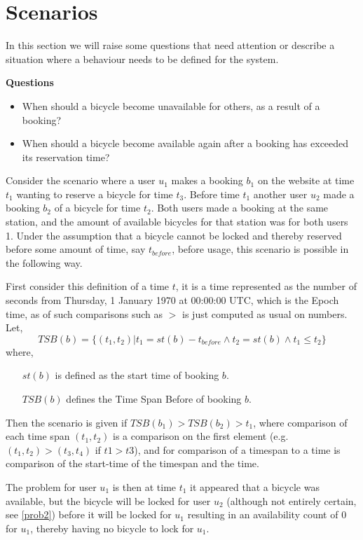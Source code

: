 \section{Scenarios}\label{sec:behaviourProblems}
In this section we will raise some questions that need attention or describe a situation where a behaviour needs to be defined for the system.

\textbf{Questions}
\begin{itemize}
\item When should a bicycle become unavailable for others, as a result of a booking?
\item When should a bicycle become available again after a booking has exceeded its reservation time?
\end{itemize}

\begin{description}[style=nextline]\label{prob1}
\item[Problem 1.1] Consider the scenario where a user $u_1$ makes a booking $b_1$ on the website at time $t_1$ wanting to reserve a bicycle for time $t_3$. Before time $t_1$ another user $u_2$ made a booking $b_2$ of a bicycle for time $t_2$. Both users made a booking at the same station, and the amount of available bicycles for that station was for both users 1. Under the assumption that a bicycle cannot be locked and thereby reserved before some amount of time, say $t_{before}$, before usage, this scenario is possible in the following way.

First consider this definition of a time $t$, it is a time represented as the number of seconds from Thursday, 1 January 1970 at 00:00:00 UTC, which is the Epoch time, as of such comparisons such as $>$ is just computed as usual on numbers.
Let, 
$$TSB(b) = \{(t_1,t_2) | t_1 = st(b) - t_{before} \land t_2 = st(b) \land t_1 \leq t_2 \}$$
where,
\begin{itemize}[align = left]
	\item[$st(b)$] is defined as the start time of booking $b$.
	\item[$TSB(b)$] defines the Time Span Before of booking $b$.
\end{itemize} 

Then the scenario is given if $TSB(b_1) > TSB(b_2) > t_1$, where comparison of each time span $(t_1, t_2)$ is a comparison on the first element (e.g. $(t_1, t_2) > (t_3, t_4)$ if $t1 > t3$), and for comparison of a timespan to a time is comparison of the start-time of the timespan and the time.

The problem for user $u_1$ is then at time $t_1$ it appeared that a bicycle was available, but the bicycle will be locked for user $u_2$ (although not entirely certain, see \ref{prob2}) before it will be locked for $u_1$ resulting in an availability count of 0 for $u_1$, thereby having no bicycle to lock for $u_1$.
\end{description}

